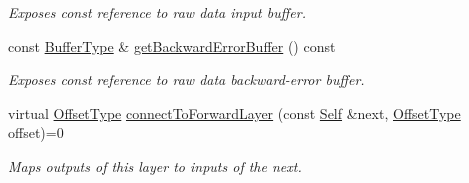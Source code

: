 \begin{DoxyCompactItemize}
\begin{DoxyCompactList}\small\item\em Exposes const reference to raw data input buffer. \end{DoxyCompactList}\item 
const \hyperlink{classffnn_1_1layer_1_1_layer_a3f2e9c375d9bcf80e6000e9e53ba212d}{Buffer\-Type} \& \hyperlink{classffnn_1_1layer_1_1_layer_a0caad62750e9610e607fb18d87df63b8}{get\-Backward\-Error\-Buffer} () const 
\begin{DoxyCompactList}\small\item\em Exposes const reference to raw data backward-\/error buffer. \end{DoxyCompactList}\item 
virtual \hyperlink{classffnn_1_1layer_1_1internal_1_1_interface_adc5bb454329ebd51ac26579a43c006fd}{Offset\-Type} \hyperlink{classffnn_1_1layer_1_1_layer_a42b960e503830c5ab13905f3e7faa939}{connect\-To\-Forward\-Layer} (const \hyperlink{classffnn_1_1layer_1_1_layer_a1d461b24632a849b2c26a5051a9cdbeb}{Self} \&next, \hyperlink{classffnn_1_1layer_1_1internal_1_1_interface_adc5bb454329ebd51ac26579a43c006fd}{Offset\-Type} offset)=0
\begin{DoxyCompactList}\small\item\em Maps outputs of this layer to inputs of the next. \end{DoxyCompactList}\end{DoxyCompactItemize}

